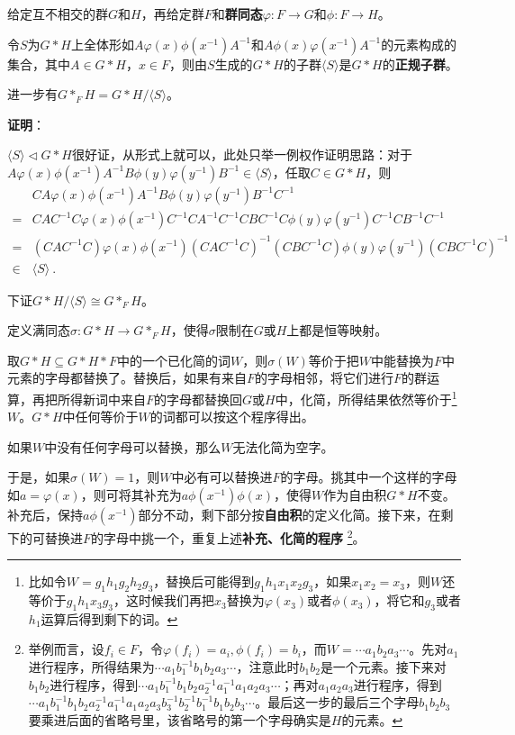 \begin{theorem}{}

给定互不相交的群$G$和$H$，再给定群$F$和\textbf{群同态}$\varphi:F\to G$和$\phi: F\to H$。

令$S$为$G*H$上全体形如$A\varphi(x)\phi(x^{-1})A^{-1}$和$A\phi(x)\varphi(x^{-1})A^{-1}$的元素构成的集合，其中$A\in G*H$，$x\in F$，则由$S$生成的$G*H$的子群$\langle S \rangle$是$G*H$的\textbf{正规子群}。

进一步有$G*_FH=G*H/\langle S \rangle$。

\end{theorem}




\textbf{证明}：

$\langle S \rangle \lhd G*H$很好证，从形式上就可以，此处只举一例权作证明思路：对于$A\varphi(x)\phi(x^{-1})A^{-1}B\phi(y)\varphi(y^{-1})B^{-1}\in \langle S \rangle$，任取$C\in G*H$，则
\begin{equation}
\begin{aligned}
    &CA\varphi(x)\phi(x^{-1})A^{-1}B\phi(y)\varphi(y^{-1})B^{-1}C^{-1} \\
    ={}& 
    CAC^{-1}C\varphi(x)\phi(x^{-1})C^{-1}CA^{-1}C^{-1}CBC^{-1}C\phi(y)\varphi(y^{-1})C^{-1}CB^{-1}C^{-1}\\
    ={}& 
    (CAC^{-1}C)\varphi(x)\phi(x^{-1})(CAC^{-1}C)^{-1}(CBC^{-1}C)\phi(y)\varphi(y^{-1})(CBC^{-1}C)^{-1}\\
    \in{}& \langle S \rangle~.
\end{aligned}
\end{equation}

下证$G*H/\langle S \rangle \cong G*_F H$。

定义满同态$\sigma:G*H\to G*_FH$，使得$\sigma$限制在$G$或$H$上都是恒等映射。

取$G*H\subseteq G*H*F$中的一个已化简的词$W$，则$\sigma(W)$等价于把$W$中能替换为$F$中元素的字母都替换了。替换后，如果有来自$F$的字母相邻，将它们进行$F$的群运算，再把所得新词中来自$F$的字母都替换回$G$或$H$中，化简，所得结果依然等价于\footnote{比如令$W=g_1h_1g_2h_2g_3$，替换后可能得到$g_1h_1x_1x_2g_3$，如果$x_1x_2=x_3$，则$W$还等价于$g_1h_1x_3g_3$，这时候我们再把$x_3$替换为$\varphi(x_3)$或者$\phi(x_3)$，将它和$g_3$或者$h_1$运算后得到剩下的词。}
$W$。$G*H$中任何等价于$W$的词都可以按这个程序得出。

如果$W$中没有任何字母可以替换，那么$W$无法化简为空字。

于是，如果$\sigma(W)=1$，则$W$中必有可以替换进$F$的字母。挑其中一个这样的字母如$a=\varphi(x)$，则可将其补充为$a\phi(x^{-1})\phi(x)$，使得$W$作为自由积$G*H$不变。补充后，保持$a\phi(x^{-1})$部分不动，剩下部分按\textbf{自由积}的定义化简。接下来，在剩下的可替换进$F$的字母中挑一个，重复上述\textbf{补充、化简的程序}
\footnote{举例而言，设$f_i\in F$，令$\varphi(f_i)=a_i, \phi(f_i)=b_i$，而$W=\cdots a_1b_2a_3 \cdots$。先对$a_1$进行程序，所得结果为$\cdots a_1b_1^{-1}b_1b_2a_3 \cdots $，注意此时$b_1b_2$是一个元素。接下来对$b_1b_2$进行程序，得到$\cdots a_1b_1^{-1}b_1b_2a_2^{-1}a_1^{-1}a_1a_2a_3 \cdots $；再对$a_1a_2a_3$进行程序，得到$\cdots a_1b_1^{-1}b_1b_2a_2^{-1}a_1^{-1}a_1a_2a_3b_3^{-1}b_2^{-1}b_1^{-1}b_1b_2b_3 \cdots $。最后这一步的最后三个字母$b_1b_2b_3$要乘进后面的省略号里，该省略号的第一个字母确实是$H$的元素。
}。

